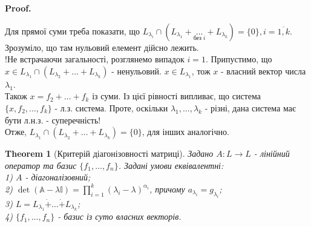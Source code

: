 \documentclass[a4paper, 10pt]{article}
\makeatletter
\theoremstyle{theoremdd}
\newtheorem{theorem}{Theorem}[subsection]
\renewenvironment{proof}[1][Proof.\\]{\par
\pushQED{\hfill \qed}%
\normalfont \topsep6\p@\@plus6\p@\relax
\trivlist
\item\relax
{\bfseries
#1\@addpunct{.}}\hspace\labelsep\ignorespaces
}{%
\popQED\endtrivlist\@endpefalse
}
\makeatother
\begin{document}
\begin{proof}
Для прямої суми треба показати, що $L_{\lambda_i} \cap \left( L_{\lambda_1} + \underset{\text{без }i}{\dots} + L_{\lambda_k} \right) = \{0\}, i = \overline{1,k}$. Зрозуміло, що там нульовий елемент дійсно лежить.\\
!Не встрачаючи загальності, розглянемо випадок $i = 1$. Припустимо, що $x \in L_{\lambda_1} \cap (L_{\lambda_2} + \dots + L_{\lambda_k})$ - ненульовий. $x \in L_{\lambda_1}$, тож $x$ - власний вектор числа $\lambda_1$.\\
Також $x = f_2 + \dots + f_k$ із суми. Із цієї рівності випливає, що система $\{x,f_2,\dots,f_k\}$ - л.з. система. Проте, оскільки $\lambda_1,\dots,\lambda_k$ - різні, дана система має бути л.н.з. - суперечність!\\
Отже, $L_{\lambda_1} \cap (L_{\lambda_2} + \dots + L_{\lambda_k}) = \{0\}$, для інших аналогічно.
\end{proof}

\begin{theorem}[Критерій діагонізовності матриці]
Задано $A \colon L \to L$ - лінійний оператор та базис $\{f_1,\dots,f_n\}$. Задані умови еквівалентні:\\
1) $A$ - діагоналізовний;\\
2) $\det (\mathbb{A}-\lambda \mathbb{I}) = \displaystyle\prod_{i=1}^k (\lambda_i - \lambda)^{\alpha_i}$, причому $a_{\lambda_i} = g_{\lambda_i}$;\\
3) $L = L_{\lambda_1} \dot{+} \dots \dot{+} L_{\lambda_k}$;\\
4) $\{f_1,\dots,f_n\}$ - базис із суто власних векторів.
\end{theorem}
\end{document}
